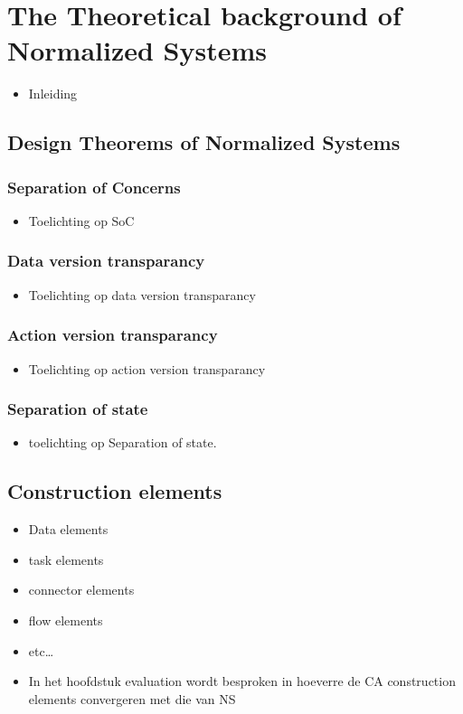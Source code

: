 \section{The Theoretical background of Normalized Systems} \label{ns_theory}
\begin{itemize}
    \item Inleiding
\end{itemize}


\subsection{Design Theorems of Normalized Systems} \label{subsec:ns_desing_theorems}


\subsubsection{Separation of Concerns}
\begin{itemize}
    \item Toelichting op SoC
\end{itemize}

\subsubsection{Data version transparancy}
\begin{itemize}
    \item Toelichting op data version transparancy
\end{itemize}

\subsubsection{Action version transparancy}
\begin{itemize}
    \item Toelichting op action version transparancy
\end{itemize}

\subsubsection{Separation of state}
\begin{itemize}
    \item toelichting op Separation of state.
\end{itemize}

\subsection{Construction elements}
\begin{itemize}
    \item Data elements
    \item task elements
    \item connector elements
    \item flow elements
    \item etc\dots
    \item In het hoofdstuk evaluation wordt
    besproken in hoeverre de CA construction elements convergeren met die van NS
\end{itemize}
